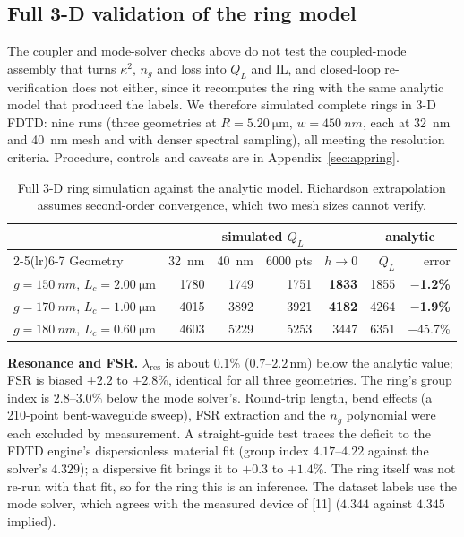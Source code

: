 \documentclass[11pt]{article}
\newcommand{\lres}{\lambda_{\mathrm{res}}}
\newcommand{\QL}{Q_L}
\begin{document}
\subsection{Full 3-D validation of the ring model}
\label{sec:ringval}

The coupler and mode-solver checks above do not test the coupled-mode assembly that turns $\kappa^2$, $n_g$ and loss into $\QL$ and IL, and closed-loop re-verification does not either, since it recomputes the ring with the same analytic model that produced the labels. We therefore simulated complete rings in 3-D FDTD: nine runs (three geometries at $R = \SI{5.20}{\micro\metre}$, $w = \SI{450}{nm}$, each at \SI{32}{nm} and \SI{40}{nm} mesh and with denser spectral sampling), all meeting the resolution criteria. Procedure, controls and caveats are in Appendix~\ref{sec:appring}.

\begin{table}[!tbp]
\centering
\caption{Full 3-D ring simulation against the analytic model. Richardson
extrapolation assumes second-order convergence, which two mesh sizes cannot
verify.}
\label{tab:ringval}
\small
\begin{tabular}{@{}lrrrrrr@{}}
\toprule
& \multicolumn{4}{c}{simulated $\QL$} & \multicolumn{2}{c}{analytic} \\
\cmidrule(lr){2-5}\cmidrule(lr){6-7}
Geometry & \SI{32}{nm} & \SI{40}{nm} & 6000 pts & $h \to 0$ & $\QL$ & error \\
\midrule
$g = \SI{150}{nm}$, $L_c = \SI{2.00}{\micro\metre}$ & 1780 & 1749 & 1751 & \textbf{1833} & 1855 & \textbf{$-$1.2\%} \\
$g = \SI{170}{nm}$, $L_c = \SI{1.00}{\micro\metre}$ & 4015 & 3892 & 3921 & \textbf{4182} & 4264 & \textbf{$-$1.9\%} \\
$g = \SI{180}{nm}$, $L_c = \SI{0.60}{\micro\metre}$ & 4603 & 5229 & 5253 & 3447 & 6351 & $-$45.7\% \\
\bottomrule
\end{tabular}
\end{table}

\textbf{Resonance and FSR.} $\lres$ is about $0.1\%$ ($0.7$--$2.2$\,nm) below the analytic value; FSR is biased $+2.2$ to $+2.8\%$, identical for all three geometries. The ring's group index is $2.8$--$3.0\%$ below the mode solver's. Round-trip length, bend effects (a 210-point bent-waveguide sweep), FSR extraction and the $n_g$ polynomial were each excluded by measurement. A straight-guide test traces the deficit to the FDTD engine's dispersionless material fit (group index $4.17$--$4.22$ against the solver's $4.329$); a dispersive fit brings it to $+0.3$ to $+1.4\%$. The ring itself was not re-run with that fit, so for the ring this is an inference. The dataset labels use the mode solver, which agrees with the measured device of [11] ($4.344$ against $4.345$ implied).
\end{document}
